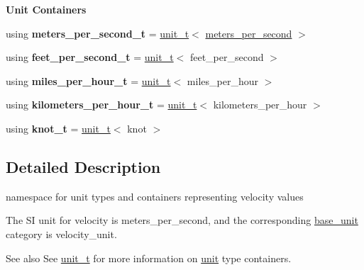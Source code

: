 \begin{Indent}{\bf Unit Containers}\par
{\em \label{namespaceunits_1_1velocity_velocityContainers}%
\hypertarget{namespaceunits_1_1velocity_velocityContainers}{}%
}\begin{DoxyCompactItemize}
\item 
\hypertarget{namespaceunits_1_1velocity_a2d4bbb6e3e8d39457592ba593d1a9d01}{}using {\bfseries meters\+\_\+per\+\_\+second\+\_\+t} = \hyperlink{classunits_1_1unit__t}{unit\+\_\+t}$<$ \hyperlink{structunits_1_1unit}{meters\+\_\+per\+\_\+second} $>$\label{namespaceunits_1_1velocity_a2d4bbb6e3e8d39457592ba593d1a9d01}

\item 
\hypertarget{namespaceunits_1_1velocity_ac102ff8565b1c74d3098bb65e8f02a48}{}using {\bfseries feet\+\_\+per\+\_\+second\+\_\+t} = \hyperlink{classunits_1_1unit__t}{unit\+\_\+t}$<$ feet\+\_\+per\+\_\+second $>$\label{namespaceunits_1_1velocity_ac102ff8565b1c74d3098bb65e8f02a48}

\item 
\hypertarget{namespaceunits_1_1velocity_a9e595a2281ac716592ac54d826724376}{}using {\bfseries miles\+\_\+per\+\_\+hour\+\_\+t} = \hyperlink{classunits_1_1unit__t}{unit\+\_\+t}$<$ miles\+\_\+per\+\_\+hour $>$\label{namespaceunits_1_1velocity_a9e595a2281ac716592ac54d826724376}

\item 
\hypertarget{namespaceunits_1_1velocity_a5a2656e8f2778d5492a9917ae09a23b6}{}using {\bfseries kilometers\+\_\+per\+\_\+hour\+\_\+t} = \hyperlink{classunits_1_1unit__t}{unit\+\_\+t}$<$ kilometers\+\_\+per\+\_\+hour $>$\label{namespaceunits_1_1velocity_a5a2656e8f2778d5492a9917ae09a23b6}

\item 
\hypertarget{namespaceunits_1_1velocity_af6e7fe8f046db7c4e2fcc1ef74841e99}{}using {\bfseries knot\+\_\+t} = \hyperlink{classunits_1_1unit__t}{unit\+\_\+t}$<$ knot $>$\label{namespaceunits_1_1velocity_af6e7fe8f046db7c4e2fcc1ef74841e99}

\end{DoxyCompactItemize}
\end{Indent}


\subsection{Detailed Description}
namespace for unit types and containers representing velocity values 

The S\+I unit for velocity is {\ttfamily meters\+\_\+per\+\_\+second}, and the corresponding {\ttfamily \hyperlink{structunits_1_1base__unit}{base\+\_\+unit}} category is {\ttfamily velocity\+\_\+unit}. \begin{DoxySeeAlso}{See also}
See \hyperlink{classunits_1_1unit__t}{unit\+\_\+t} for more information on \hyperlink{structunits_1_1unit}{unit} type containers. 
\end{DoxySeeAlso}
